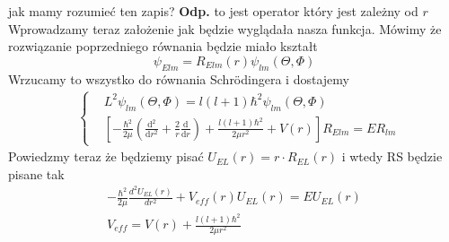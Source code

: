  jak mamy rozumieć ten zapis? \textbf{Odp.} to jest operator który jest zależny od $r$
Wprowadzamy teraz założenie jak będzie wyglądała nasza funkcja. Mówimy że rozwiązanie poprzedniego równania będzie miało kształt
\begin{equation*}
	\psi_{Elm} = R_{Elm}(r) \psi_{lm}(\Theta, \Phi)
\end{equation*}
Wrzucamy to wszystko do równania Schrödingera i dostajemy
\begin{align*}
	&\left\{
	\begin{aligned}
		&L^2 \psi_{lm}(\Theta, \Phi) =  l(l+1) \hbar^2 \psi_{lm}(\Theta, \Phi)\\
		&\left[-\frac{\hbar^2}{2\mu} \left(\frac{\text{d}^2}{\text{d}r^2} + \frac2r \frac{\text{d}}{\text{d}r} \right) + \frac{l(l+1)\hbar^2}{2 \mu r^2} + V(r)\right] R_{Elm} = E R_{lm}
	\end{aligned}
	\right.
\end{align*}
Powiedzmy teraz że będziemy pisać $U_{EL}(r) = r \cdot R_{EL}(r)$ i wtedy RS będzie pisane tak
\begin{equation*}
	\begin{gathered}
		-\frac{\hbar^2}{2\mu}\frac{d^2 U_{EL}(r)}{dr^2}+V_{eff}(r)U_{EL}(r)=EU_{EL}(r) \\
		V_{eff} = V(r)+\frac{l(l+1)\hbar^2}{2\mu r^2}
	\end{gathered}
\end{equation*}
